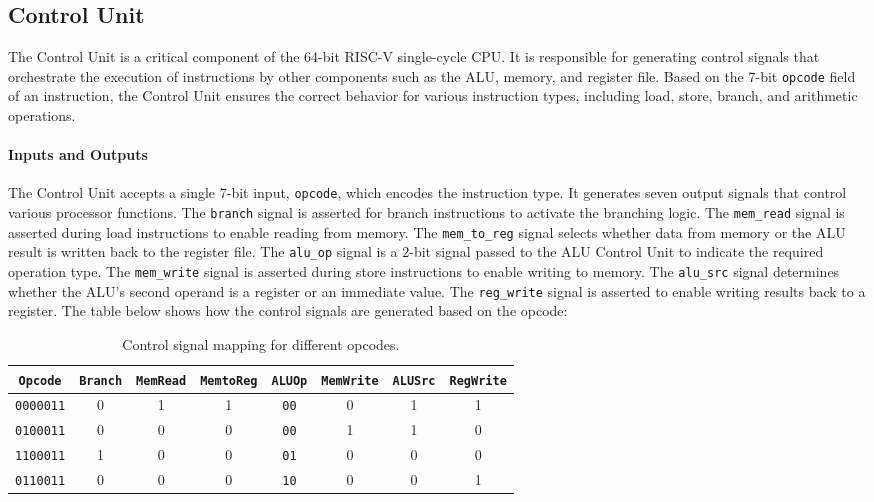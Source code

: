 \documentclass[12pt]{article}
\begin{document}
\subsection*{Control Unit}

The Control Unit is a critical component of the 64-bit RISC-V single-cycle CPU. It is responsible for generating control signals that orchestrate the execution of instructions by other components such as the ALU, memory, and register file. Based on the 7-bit \texttt{opcode} field of an instruction, the Control Unit ensures the correct behavior for various instruction types, including load, store, branch, and arithmetic operations.

\paragraph{Inputs and Outputs}
The Control Unit accepts a single 7-bit input, \texttt{opcode}, which encodes the instruction type. It generates seven output signals that control various processor functions. The \texttt{branch} signal is asserted for branch instructions to activate the branching logic. The \texttt{mem\_read} signal is asserted during load instructions to enable reading from memory. The \texttt{mem\_to\_reg} signal selects whether data from memory or the ALU result is written back to the register file. The \texttt{alu\_op} signal is a 2-bit signal passed to the ALU Control Unit to indicate the required operation type. The \texttt{mem\_write} signal is asserted during store instructions to enable writing to memory. The \texttt{alu\_src} signal determines whether the ALU's second operand is a register or an immediate value. The \texttt{reg\_write} signal is asserted to enable writing results back to a register. The table below shows how the control signals are generated based on the opcode:

\begin{table}[h!]
    \centering
    \renewcommand{\arraystretch}{1.1}
    \setlength{\tabcolsep}{2pt}
    \begin{tabular}{|c|c|c|c|c|c|c|c|}
        \hline
        \textbf{\texttt{Opcode}} & \textbf{\texttt{Branch}} & \textbf{\texttt{MemRead}} & \textbf{\texttt{MemtoReg}} & \textbf{\texttt{ALUOp}} & \textbf{\texttt{MemWrite}} & \textbf{\texttt{ALUSrc}} & \textbf{\texttt{RegWrite}} \\
        \hline
        \texttt{0000011} & 0 & 1 & 1 & \texttt{00} & 0 & 1 & 1 \\
        \texttt{0100011} & 0 & 0 & 0 & \texttt{00} & 1 & 1 & 0 \\
        \texttt{1100011} & 1 & 0 & 0 & \texttt{01} & 0 & 0 & 0 \\
        \texttt{0110011} & 0 & 0 & 0 & \texttt{10} & 0 & 0 & 1 \\
        \hline
    \end{tabular}
    \caption{Control signal mapping for different opcodes.}
    \label{tab:control_unit_mapping}
\end{table}
\end{document}
